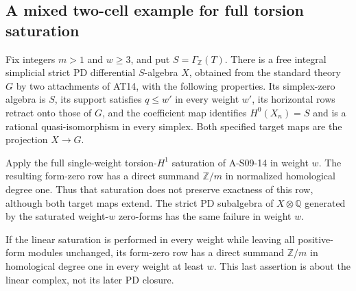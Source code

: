 \subsection{A mixed two-cell example for full torsion saturation}

\begin{proposition}
\label{AL09}
Fix integers $m>1$ and $w\geq3$, and put
$S=\Gamma_{\mathbb Z}(T)$.
There is a free integral simplicial strict PD differential
$S$-algebra $X$, obtained from the standard theory $G$ by
two attachments of AT14, with the following properties.
Its simplex-zero algebra is $S$, its support satisfies
$q\leq w'$ in every weight $w'$, its horizontal rows
retract onto those of $G$, and the coefficient map
identifies $H^0(X_n)=S$ and is a rational quasi-isomorphism
in every simplex.  Both specified target maps are the
projection $X\to G$.

Apply the full single-weight torsion-$H^1$ saturation
of A-S09-14 in weight $w$.  The resulting form-zero
row has a direct summand $\mathbb Z/m$ in normalized
homological degree one.  Thus that saturation does
not preserve exactness of this row, although both
target maps extend.  The strict PD subalgebra of
$X\otimes\mathbb Q$ generated by the saturated
weight-$w$ zero-forms has the same failure in weight $w$.

If the linear saturation is performed in every
weight while leaving all positive-form modules
unchanged, its form-zero row has a direct summand
$\mathbb Z/m$ in homological degree one in every
weight at least $w$.  This last assertion is about
the linear complex, not its later PD closure.
\end{proposition}

